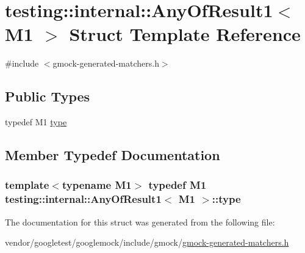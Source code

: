\hypertarget{structtesting_1_1internal_1_1AnyOfResult1}{}\section{testing\+:\+:internal\+:\+:Any\+Of\+Result1$<$ M1 $>$ Struct Template Reference}
\label{structtesting_1_1internal_1_1AnyOfResult1}


{\ttfamily \#include $<$gmock-\/generated-\/matchers.\+h$>$}

\subsection*{Public Types}
\begin{DoxyCompactItemize}
\item 
typedef M1 \hyperlink{structtesting_1_1internal_1_1AnyOfResult1_a4c55b5cf196c93e2a822bc99625f6797}{type}
\end{DoxyCompactItemize}


\subsection{Member Typedef Documentation}
\subsubsection[{\texorpdfstring{type}{type}}]{\setlength{\rightskip}{0pt plus 5cm}template$<$typename M1$>$ typedef M1 {\bf testing\+::internal\+::\+Any\+Of\+Result1}$<$ M1 $>$\+::{\bf type}}\hypertarget{structtesting_1_1internal_1_1AnyOfResult1_a4c55b5cf196c93e2a822bc99625f6797}{}\label{structtesting_1_1internal_1_1AnyOfResult1_a4c55b5cf196c93e2a822bc99625f6797}


The documentation for this struct was generated from the following file\+:\begin{DoxyCompactItemize}
\item 
vendor/googletest/googlemock/include/gmock/\hyperlink{gmock-generated-matchers_8h}{gmock-\/generated-\/matchers.\+h}\end{DoxyCompactItemize}

